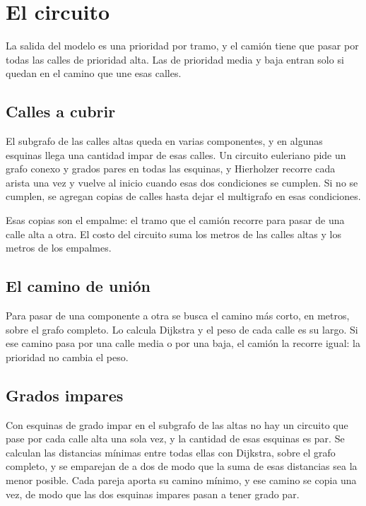 \documentclass[12pt,a4paper]{report}
\begin{document}
\chapter{El circuito}

La salida del modelo es una prioridad por tramo, y el camión tiene que pasar por todas las calles de prioridad alta. Las de prioridad media y baja entran solo si quedan en el camino que une esas calles.

\section{Calles a cubrir}

El subgrafo de las calles altas queda en varias componentes, y en algunas esquinas llega una cantidad impar de esas calles. Un circuito euleriano pide un grafo conexo y grados pares en todas las esquinas, y Hierholzer recorre cada arista una vez y vuelve al inicio cuando esas dos condiciones se cumplen. Si no se cumplen, se agregan copias de calles hasta dejar el multigrafo en esas condiciones.

Esas copias son el empalme: el tramo que el camión recorre para pasar de una calle alta a otra. El costo del circuito suma los metros de las calles altas y los metros de los empalmes.

\section{El camino de unión}

Para pasar de una componente a otra se busca el camino más corto, en metros, sobre el grafo completo. Lo calcula Dijkstra y el peso de cada calle es su largo. Si ese camino pasa por una calle media o por una baja, el camión la recorre igual: la prioridad no cambia el peso.

\section{Grados impares}

Con esquinas de grado impar en el subgrafo de las altas no hay un circuito que pase por cada calle alta una sola vez, y la cantidad de esas esquinas es par. Se calculan las distancias mínimas entre todas ellas con Dijkstra, sobre el grafo completo, y se emparejan de a dos de modo que la suma de esas distancias sea la menor posible. Cada pareja aporta su camino mínimo, y ese camino se copia una vez, de modo que las dos esquinas impares pasan a tener grado par.
\end{document}
